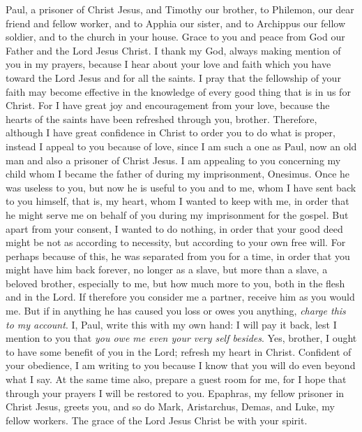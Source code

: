 
\begin{biblechapter} %
 Paul, a prisoner of Christ Jesus, and Timothy our brother, to Philemon, our dear friend and fellow worker,
\verse and to Apphia our sister, and to Archippus our fellow soldier, and to the church in your house.
\verse Grace to you and peace from God our Father and the Lord Jesus Christ.
 I thank my God, always making mention of you in my prayers,
\verse because I hear about your love and faith which you have toward the Lord Jesus and for all the saints.
\verse I pray that the fellowship of your faith may become effective in the knowledge of every good thing that is in us for Christ.
\verse For I have great joy and encouragement from your love, because the hearts of the saints have been refreshed through you, brother.
 Therefore, although I have great confidence in Christ to order you to do what is proper,
\verse instead I appeal to you because of love, since I am such a one as Paul, now an old man and also a prisoner of Christ Jesus.
\verse I am appealing to you concerning my child whom I became the father of during my imprisonment, Onesimus.
\verse Once he was useless to you, but now he is useful to you and to me,
\verse whom I have sent back to you himself, that is, my heart,
\verse whom I wanted to keep with me, in order that he might serve me on behalf of you during my imprisonment for the gospel.
\verse But apart from your consent, I wanted to do nothing, in order that your good deed might be not as according to necessity, but according to your own free will.
\verse For perhaps because of this, he was separated from you for a time, in order that you might have him back forever,
\verse no longer as a slave, but more than a slave, a beloved brother, especially to me, but how much more to you, both in the flesh and in the Lord.
 If therefore you consider me a partner, receive him as you would me.
\verse But if in anything he has caused you loss or owes you anything, \textit{charge this to my account}.
\verse I, Paul, write this with my own hand: I will pay it back, lest I mention to you that \textit{you owe me even your very self besides}.
\verse Yes, brother, I ought to have some benefit of you in the Lord; refresh my heart in Christ.
\verse Confident of your obedience, I am writing to you because I know that you will do even beyond what I say.
\verse At the same time also, prepare a guest room for me, for I hope that through your prayers I will be restored to you.
 Epaphras, my fellow prisoner in Christ Jesus, greets you,
\verse and so do Mark, Aristarchus, Demas, and Luke, my fellow workers.
\verse The grace of the Lord Jesus Christ be with your spirit.
\end{biblechapter}

